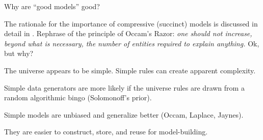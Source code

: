 \begin{frame}[label=ladila]{Why are ``good models'' good?}

The rationale for the importance of compressive (succinct) models is discussed in detail in \cite{Ruffini:2007aa,Ruffini:2009aa,Ruffini2017}.  Rephrase of the principle of Occam’s Razor: {\em
one should not increase, beyond what is necessary, the number of entities required to explain anything.}  Ok, but why?\vfill

The universe appears to be simple. Simple rules can create apparent complexity.\vfill


Simple data generators are more likely if the universe rules are drawn from a random algorithmic bingo (Solomonoff's prior). \vfill

Simple models are unbiased and generalize better (Occam, Laplace, Jaynes). \vfill

They are easier to construct,  store,  and reuse for model-building. \vfill



\end{frame}
